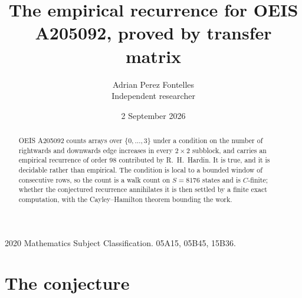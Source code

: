\documentclass[11pt,a4paper]{article}
\title{The empirical recurrence for OEIS A205092, proved by transfer matrix}
\author{Adrian Perez Fontelles\\ \small Independent researcher}
\date{2 September 2026}
\theoremstyle{plain}
\theoremstyle{definition}
\begin{document}
\maketitle

\begin{abstract}
OEIS A205092 counts arrays over $\{0,\dots,3\}$ under a condition on the number of rightwards and downwards edge increases
in every $2\times2$ subblock, and carries an empirical recurrence of order $98$ contributed by
R.~H.~Hardin. It is true, and it is decidable rather than empirical. The condition is local to
a bounded window of consecutive rows, so the count is a walk count on $S=8176$ states and is
$C$-finite; whether the conjectured recurrence annihilates it is then settled by a finite exact
computation, with the Cayley--Hamilton theorem bounding the work.
\end{abstract}

\noindent\small 2020 Mathematics Subject Classification. 05A15, 05B45, 15B36.\normalsize

\section{The conjecture}
\end{document}
